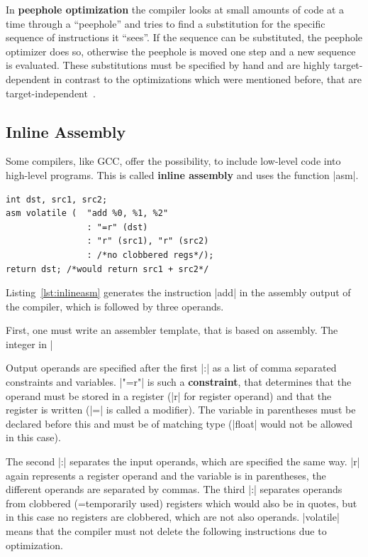 {In \textbf{peephole optimization} the compiler looks at small amounts of code at a time through a ``peephole'' and tries to find a substitution for the specific sequence of instructions it ``sees''.
If the sequence can be substituted, the peephole optimizer does so, otherwise the peephole is moved one step and a new sequence is evaluated.
These substitutions must be specified by hand and are highly target-dependent in contrast to the optimizations which were mentioned before, that are target-independent~\cite{UBHD-67548259}.

\subsection{Inline Assembly}
\label{section:asm}
Some compilers, like GCC, offer the possibility, to include low-level code into high-level programs.
This is called \textbf{inline assembly} and uses the function |asm|.
\begin{lstlisting}[caption= Exemplatory Assembly Invokation, label=lst:inlineasm, float, floatplacement=htbp]
int dst, src1, src2;
asm volatile (  "add %0, %1, %2"
                : "=r" (dst)
                : "r" (src1), "r" (src2)
                : /*no clobbered regs*/);
return dst; /*would return src1 + src2*/
\end{lstlisting}

Listing~\ref{lst:inlineasm} generates the instruction |add| in the assembly output of the compiler, which is followed by three operands.

First, one must write an assembler template, that is based on assembly.
The integer in |%

Output operands are specified after the first |:| as a list of comma separated constraints and variables.
|"=r"| is such a \textbf{constraint}, that determines that the operand must be stored in a register (|r| for register operand) and that the register is written (|=| is called a modifier).
The variable in parentheses must be declared before this and must be of matching type (|float| would not be allowed in this case).

The second |:| separates the input operands, which are specified the same way.
|r| again represents a register operand and the variable is in parentheses, the different operands are separated by commas.
The third |:| separates operands from clobbered (=temporarily used) registers which would also be in quotes, but in this case no registers are clobbered, which are not also operands.
|volatile| means that the compiler must not delete the following instructions due to optimization.

}
